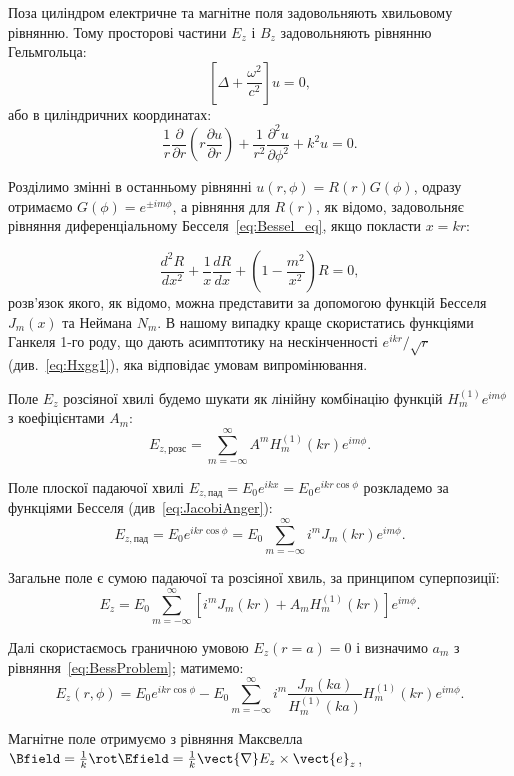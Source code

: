 \begin{problem}
\begin{solution}
	Поза циліндром електричне та магнітне поля задовольняють хвильовому рівнянню.
	Тому просторові частини $E_z$ і $B_z$ задовольняють рівнянню Гельмгольца:
	\[
		\left[ \Delta + \frac{\omega^2}{c^2}\right] u = 0,
	\]
	або в циліндричних координатах:
	\[
		\frac1r \frac{\partial }{\partial r}
		\left( r \frac{\partial u}{\partial r} \right) + \frac{1}{r^2} \frac{\partial^2 u}{\partial
		\phi^2} + k^2 u = 0.
	\]

	Розділимо змінні в останньому рівнянні $u(r,\phi) = R(r)G(\phi)$, одразу отримаємо $G(\phi) =
	e^{\pm im\phi}$, а рівняння для $R(r)$, як відомо, задовольняє рівняння диференціальному
	Бесселя~\eqref{eq:Bessel_eq}, якщо покласти $x = kr$:

	\begin{equation}\label{eq:BessProblem}\tag{*}
		\frac{d^2R}{dx^2} + \frac1x\frac{dR}{dx} + \left(1 - \frac{m^2}{x^2} \right) R = 0,
	\end{equation}
	розв'язок якого, як відомо, можна представити за допомогою функцій Бесселя $J_m(x)$ та Неймана
	$N_m$.
	В нашому випадку краще скористатись функціями Ганкеля 1-го роду, що дають асимптотику на
	нескінченності $e^{ikr}/\sqrt{r}$ (див.~\eqref{eq:Hxgg1}), яка відповідає умовам випромінювання.

	Поле  $E_z$ розсіяної хвилі будемо шукати як  лінійну комбінацію функцій $H_m^{(1)}e^{im\phi}$ з
	коефіцієнтами $A_m$:
	\[
		E_{z,\text{розс}} =  \sum\limits_{m = -\infty}^{\infty} A^m H^{(1)}_m(k r)e^{im\phi}.
	\]

	Поле плоскої падаючої хвилі $ E_{z,\text{пад}} = E_0e^{ikx} = E_0e^{ikr\cos\phi}$ розкладемо за
	функціями Бесселя (див~\eqref{eq:JacobiAnger}):
	\[
		E_{z,\text{пад}} =  E_0e^{ikr\cos\phi} =  E_0 \sum\limits_{m = -\infty}^{\infty} i^m J_m(k
		r)e^{im\phi}.
	\]

	Загальне поле є сумою падаючої та розсіяної хвиль, за принципом суперпозиції:
	\[
		E_z = E_0 \sum\limits_{m = -\infty}^{\infty}[ i^mJ_m(kr) + A_mH^{(1)}_m(kr)]e^{im\phi}.
	\]

	Далі скористаємось граничною умовою $E_z(r = a) = 0$  і визначимо $a_m$ з
	рівняння~\eqref{eq:BessProblem}; матимемо:
	\[
		E_z(r,\phi) = E_0e^{ikr\cos\phi} - E_0\sum\limits_{m = -\infty}^{\infty} i^m
		\frac{J_m(ka)}{H_m^{(1)}(ka)}H_m^{(1)}(kr)e^{im\phi}.
	\]

	Магнітне поле отримуємо з рівняння Максвелла $\Bfield = \frac1k\rot\Efield = \frac1k
	\vect{\nabla}E_z\times \vect{e}_z$,


\end{solution}
\end{problem}
